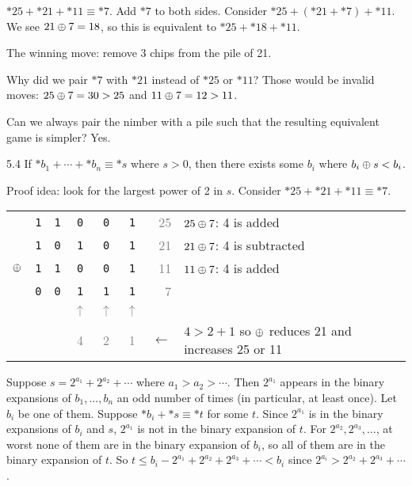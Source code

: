 \documentclass[12pt,letterpaper]{report}
\begin{document}
\begin{ex}
  $*25 + *21 + *11 \equiv *7$.
  Add $*7$ to both sides.
  Consider $*25 + (*21 + *7) + *11$.
  We see $21 \oplus 7 = 18$, so this is equivalent to $*25 + *18 + *11$.

  The winning move: remove 3 chips from the pile of 21.

  Why did we pair $*7$ with $*21$ instead of $*25$ or $*11$?
  Those would be invalid moves: $25 \oplus 7 = 30 > 25$ and $11 \oplus 7 = 12 > 11$.
\end{ex}

Can we always pair the nimber with a pile such that the resulting equivalent game is simpler?
Yes.

\begin{lem}{}{5.4}
  If $*b_1 + \cdots + *b_n \equiv *s$ where $s > 0$, then there exists some $b_i$ where
  $b_i \oplus s < b_i$.
\end{lem}

Proof idea: look for the largest power of 2 in $s$.
Consider $*25 + *21 + *11 \equiv *7$.
\begin{center}
  \begin{tabular}{c c c c c c r l}
     & \texttt{1} & \texttt{1} & \cellcolor{blue!20}\texttt{0} & \texttt{0} & \texttt{1}
      & \qquad\textcolor{gray}{25} & $25 \oplus 7$: 4 is added \\
     & \texttt{1} & \texttt{0} & \cellcolor{blue!20}\texttt{1} & \texttt{0} & \texttt{1}
      & \qquad\textcolor{gray}{21} & $21 \oplus 7$: 4 is subtracted \\
    $\oplus$ & \texttt{1} & \texttt{1} & \cellcolor{blue!20}\texttt{0} & \texttt{0} & \texttt{1}
      & \qquad\textcolor{gray}{11} & $11 \oplus 7$: 4 is added \\
    \cline{1-6}
     & \texttt{0} & \texttt{0} & \cellcolor{blue!20}\texttt{1} & \texttt{1} & \texttt{1}
      & \qquad\textcolor{gray}{7} & \\
     & & & \textcolor{gray}{$\uparrow$} & \textcolor{gray}{$\uparrow$}
      & \textcolor{gray}{$\uparrow$} & & \\
     & & & \textcolor{gray}{4} & \textcolor{gray}{2} & \textcolor{gray}{1}
      & $\leftarrow$ & $4 > 2 + 1$ so $\oplus$ reduces 21 and increases 25 or 11 \\
  \end{tabular}
\end{center}

\begin{thmproof}
  Suppose $s = 2^{a_1} + 2^{a_2} + \cdots$ where $a_1 > a_2 > \cdots$.
  Then $2^{a_1}$ appears in the binary expansions of $b_1, \ldots, b_n$ an odd number of times (in
  particular, at least once).
  Let $b_i$ be one of them.
  Suppose $*b_i + *s \equiv *t$ for some $t$.
  Since $2^{a_1}$ is in the binary expansions of $b_i$ and $s$, $2^{a_1}$ is not in the binary
  expansion of $t$.
  For $2^{a_2}, 2^{a_3}, \ldots$, at worst none of them are in the binary expansion of $b_i$, so all
  of them are in the binary expansion of $t$.
  So $t \leq b_i - 2^{a_1} + 2^{a_2} + 2^{a_3} + \cdots < b_i$ since
  $2^{a_i} > 2^{a_2} + 2^{a_3} + \cdots$.
\end{thmproof}
\end{document}
